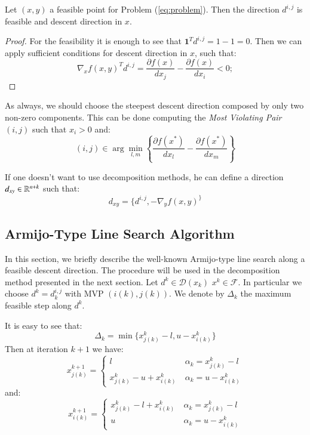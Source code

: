 \begin{proposition}
Let $(x,y)$ a feasible point for Problem (\ref{eq:problem}). Then the direction $d^{i,j}$ is  feasible and descent direction in $x$.
\end{proposition}
\begin{proof}
For the feasibility it is enough to see that $\mathbf{1}^Td^{i,j}=1-1=0$.
Then we can apply sufficient conditions for descent direction in $x$, such that:
\begin{equation*}
 \nabla_xf(x,y)^Td^{i,j} =  \frac{\partial f(x)}{dx_j} - \frac{\partial f(x)}{dx_i}<0; 
\end{equation*}
\end{proof}

As always, we should choose the steepest descent direction composed by only two non-zero components.
This can be done computing the \emph{Most Violating Pair} $(i,j)$ such that $x_i>0$ and:
\begin{equation}
 (i,j) \in \arg \min_{l,m} \left\{\frac{\partial f(x^*)}{dx_l} - \frac{\partial f(x^*)}{dx_m}  \right\}
\end{equation}

If one doesn't want to use decomposition methods, he can define a direction $d_{xy} \in \mathbb{R}^{n+k}$ such that:
\begin{equation}
 d_{xy}=\{d^{i,j},-\nabla_yf(x,y)^
 \}
\end{equation}

\subsection{Armijo-Type Line Search Algorithm}
In this section, we briefly describe the well-known Armijo-type line search along a feasible descent direction. The procedure will be used in the decomposition method presented in the next section. 
Let $d^{k} \in \mathcal{D}(x_k)$  $x^{k} \in \mathcal{F}$. In particular we choose $d^{k}=d^{i,j}_k$ with MVP $(i(k),j(k))$.
We denote by $\Delta_{k}$ the maximum feasible step along $d^{k}$. 

It is easy to see that:
\begin{equation*}
\Delta_k=\min \{ x^k_{j(k)}-l, u-x^k_{i(k)}\}
\end{equation*}
Then at iteration $k+1$ we have:
\begin{equation*}
x^{k+1}_{j(k)}=\begin{cases}
 l \ &\alpha_k=x^k_{j(k)}-l\\
 x^k_{j(k)}-u+x^k_{i(k)} \ &\alpha_k=u-x^k_{i(k)}
 \end{cases}
\end{equation*}
and:
\begin{equation*}
x^{k+1}_{i(k)}=\begin{cases}
 x^k_{j(k)}-l+x^k_{i(k)} \ &\alpha_k=x^k_{j(k)}-l\\
 u \ &\alpha_k=u-x^k_{i(k)}
 \end{cases}
\end{equation*}


